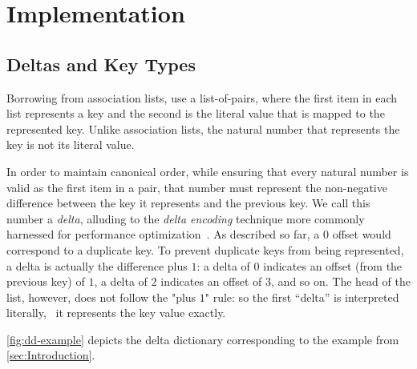 \section{Implementation}
\label{sec:DD}





\subsection{Deltas and Key Types}

Borrowing from association lists, \dds{} use a list-of-pairs, where the first item in each list represents a key and the second is the literal value that is mapped to the represented key.
%
Unlike association lists, the natural number that represents the key is not its literal value.

In order to maintain canonical order, while ensuring that every natural number is valid as the first item in a pair, that number must represent the non-negative difference between the key it represents and the previous key.
%
We call this number a \emph{delta}, alluding to the \emph{delta encoding} technique more commonly harnessed for performance optimization~\citep{XXX}.
%
As described so far, a $0$ offset would correspond to a duplicate key.
%
To prevent duplicate keys from being represented, a delta is actually the difference plus $1$: a delta of $0$ indicates an offset (from the previous key) of $1$, a delta of $2$ indicates an offset of $3$, and so on.
%
The head of the list, however, does not follow the "plus $1$" rule: so the first ``delta'' is interpreted literally, \ie{}~it represents the key value exactly.

\autoref{fig:dd-example} depicts the delta dictionary corresponding to the example from \autoref{sec:Introduction}.


